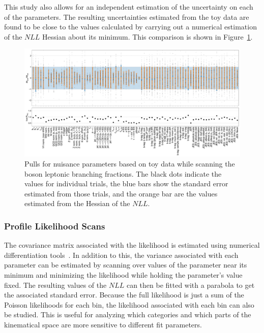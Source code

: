 This study also allows for an independent estimation of the uncertainty on each of the parameters.  The resulting uncertainties estimated from the toy data are found to be close to the values calculated by carrying out a numerical estimation of the $NLL$ Hessian about its minimum.  This comparison is shown in Figure~\ref{fig:analysis:method:mle:pulls_comparison}.

\begin{figure}
    \centering
    \includegraphics[width=0.9\textheight]{chapters/Analysis/sectionStatisticalAnalysis/figures/new_pulls}
    \caption{Pulls for nuisance parameters based on toy data while scanning the \PW boson leptonic branching fractions.  The black dots indicate the values for individual trials, the blue bars show the standard error estimated from those trials, and the orange bar are the values estimated from the Hessian of the $NLL$.}
    \label{fig:analysis:method:mle:pulls_comparison}
\end{figure}


\FloatBarrier

\subsubsection{Profile Likelihood Scans}

The covariance matrix associated with the likelihood is estimated using numerical differentiation tools~\cite{numdifftools}.  In addition to this, the variance associated with each parameter can be estimated by scanning over values of the parameter near its minimum and minimizing the likelihood while holding the parameter's value fixed.  The resulting values of the $NLL$ can then be fitted with a parabola to get the associated standard error.  Because the full likelihood is just a sum of the Poisson likelihoods for each bin, the likelihood associated with each bin can also be studied.  This is useful for analyzing which categories and which parts of the kinematical space are more sensitive to different fit parameters.  

